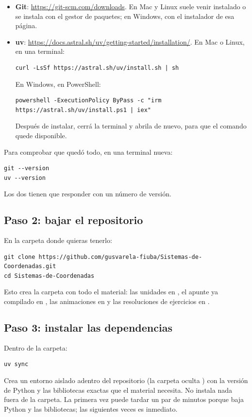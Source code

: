 \documentclass[11pt,a4paper]{report}
\newcommand{\clave}[1]{\texttt{\detokenize{#1}}}
\begin{document}
\begin{itemize}
  \item \textbf{Git}: \url{https://git-scm.com/downloads}. En Mac y Linux suele venir instalado o se instala con el gestor de paquetes; en Windows, con el instalador de esa página.
  \item \textbf{uv}: \url{https://docs.astral.sh/uv/getting-started/installation/}. En Mac o Linux, en una terminal:
\begin{lstlisting}[style=terminal]
curl -LsSf https://astral.sh/uv/install.sh | sh
\end{lstlisting}
  En Windows, en PowerShell:
\begin{lstlisting}[style=terminal]
powershell -ExecutionPolicy ByPass -c "irm https://astral.sh/uv/install.ps1 | iex"
\end{lstlisting}
  Después de instalar, cerrá la terminal y abrila de nuevo, para que el comando \clave{uv} quede disponible.
\end{itemize}

Para comprobar que quedó todo, en una terminal nueva:
\begin{lstlisting}[style=terminal]
git --version
uv --version
\end{lstlisting}
Los dos tienen que responder con un número de versión.

\subsection{Paso 2: bajar el repositorio}

En la carpeta donde quieras tenerlo:
\begin{lstlisting}[style=terminal]
git clone https://github.com/gusvarela-fiuba/Sistemas-de-Coordenadas.git
cd Sistemas-de-Coordenadas
\end{lstlisting}
Esto crea la carpeta  con todo el material: las unidades en , el apunte ya compilado en , las animaciones en  y las resoluciones de ejercicios en .

\subsection{Paso 3: instalar las dependencias}

Dentro de la carpeta:
\begin{lstlisting}[style=terminal]
uv sync
\end{lstlisting}
Crea un entorno aislado adentro del repositorio (la carpeta oculta ) con la versión de Python y las bibliotecas exactas que el material necesita. No instala nada fuera de la carpeta. La primera vez puede tardar un par de minutos porque baja Python y las bibliotecas; las siguientes veces es inmediato.
\end{document}
